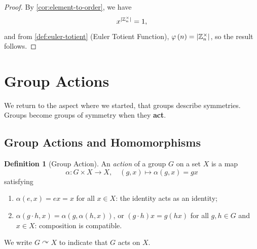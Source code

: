 \documentclass{article}
\theoremstyle{definition}
\newtheorem{definition}[theorem]{Definition}
\theoremstyle{remark}
\DeclarePairedDelimiter{\abs}{\lvert}{\rvert}
\newcommand{\pqty}[1]{\left(#1\right)}
\newcommand{\function}[5]{#1:#2\to #3,\quad #4\mapsto #5}
\newcommand{\actson}{\curvearrowright}
\newcommand{\ZZ}{\mathbb{Z}}
\newcommand{\totient}{\varphi}
\begin{document}
\begin{proof}
    By \autoref{cor:element-to-order}, we have
    \[
        x^{\abs{\ZZ_n^{\times}}} = 1,
    \]
    and from \autoref{def:euler-totient} (Euler Totient Function), \(\totient\pqty{n} = \abs{\ZZ_n^{\times}}\), so the result follows.
\end{proof}

\section{Group Actions}
\label{sec:group-actions}

We return to the aspect where we started, that groups describe symmetries. Groups become groups of symmetry when they \textbf{act}.

\subsection{Group Actions and Homomorphisms}
\label{sec:group-actions-homomorphisms}

\begin{definition}[Group Action]
    \label{def:group-action}%
    An \emph{action} of a group \(G\) on a set \(X\) is a map
    \[
        \function{\alpha}{G \times X}{X}{\pqty{g, x}}{\alpha\pqty{g, x} = gx}
    \]
    satisfying
    \begin{enumerate}
        \item \(\alpha\pqty{e, x} = ex = x\) for all \(x \in X\): the identity acts as an identity;
        \item \(\alpha\pqty{g \cdot h, x} = \alpha\pqty{g, \alpha\pqty{h, x}}\), or \(\pqty{g \cdot h}x = g \pqty{hx}\) for all \(g, h \in G\) and \(x \in X\): composition is compatible.
    \end{enumerate}

    We write \(G \actson X\) to indicate that \(G\) acts on \(X\).
\end{definition}
\end{document}
